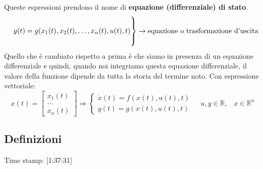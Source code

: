 Queste espressioni prendono il nome di \textbf{equazione (differenziale) di stato}.
\[
    \begin{rcases}
        \\
        \;\;\;\; y(t) = g(x_1(t),x_2(t), \dots, x_n(t), u(t), t)\\
        \\
    \end{rcases} \rightarrow \text{equazione o trasformazione d'uscita}\;
\]
Quello che è cambiato rispetto a prima è che siamo in presenza di un equazione differenziale e quindi, quando noi integriamo questa equazione differenziale, il valore della funzione dipende da tutta la storia del termine noto.\newline
Con espressione vettoriale:
\[
    x(t) = \left[\begin{matrix}
        x_1(t)\\
        \dots\\
        x_n(t)
    \end{matrix}\right] \Rightarrow  \begin{cases}
        \dot{x}(t) = f(x(t), u(t),t)\\
        y(t) = g(x(t),u(t),t)
    \end{cases} \;\;\;\;u,y \in \mathbb{R}, \;\;\;x \in \mathbb{R}^n
\]
\subsection{Definizioni}
Time stamp: [1:37:31]